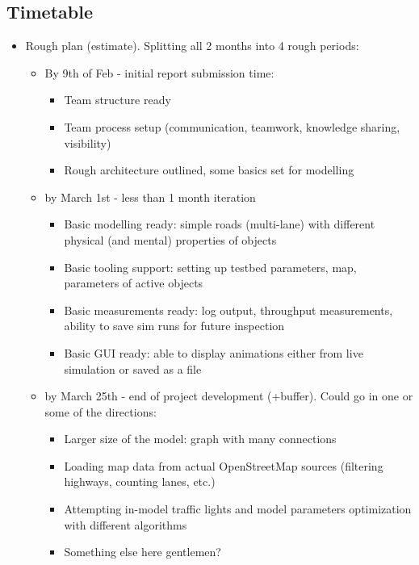 \subsection{Timetable}
 

\begin{itemize}


	\item Rough plan (estimate). Splitting all 2 months into 4 rough periods:
	\begin{itemize}

	    \item By 9th of Feb - initial report submission time:
	    \begin{itemize}
	        \item Team structure ready
	        \item Team process setup (communication, teamwork, knowledge sharing, visibility)
	        \item Rough architecture outlined, some basics set for modelling
	    \end{itemize}

	    \item by March 1st - less than 1 month iteration
	    \begin{itemize}
	        \item Basic modelling ready: simple roads (multi-lane) with different physical (and mental) properties of objects
	        \item Basic tooling support: setting up testbed parameters, map, parameters of active objects
	        \item Basic measurements ready: log output, throughput measurements, ability to save sim runs for future inspection
	        \item Basic GUI ready: able to display animations either from live simulation or saved as a file
	    \end{itemize}

	    \item by March 25th - end of project development (+buffer). Could go in one or some of the directions:
	    \begin{itemize}
	        \item Larger size of the model: graph with many connections
	        \item Loading map data from actual OpenStreetMap sources (filtering highways, counting lanes, etc.)
	        \item Attempting in-model traffic lights and model parameters optimization with different algorithms
	        \item Something else here gentlemen?
	    \end{itemize}


\end{itemize}
\end{itemize}
